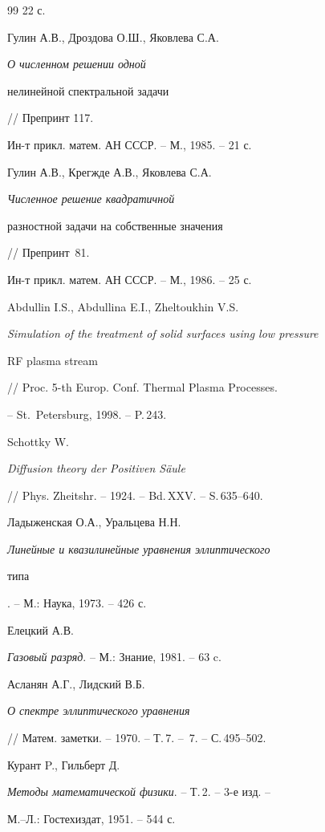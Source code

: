 \begin{thebibliography}{99}
22 с. 




Гулин А.В., Дроздова О.Ш., Яковлева С.А. {\em О численном решении одной


нелинейной спектральной задачи} // Препринт \No\.117.


Ин-т прикл. матем. АН СССР. -- М., 1985. -- 21 с. 




Гулин А.В., Крегжде А.В., Яковлева С.А. {\em Численное решение квадратичной


разностной задачи на собственные значения} // Препринт \No\,81.


Ин-т прикл. матем. АН СССР. -- М., 1986. -- 25 с. 




Abdullin I.S., Abdullina E.I., Zheltoukhin V.S.


{\em Simulation of the treatment of solid surfaces using low pressure


RF plasma stream} // Proc. 5-th Europ. Conf. Thermal Plasma Processes.


-- St.~Petersburg, 1998. -- P.\,243.




Schottky W. 


{\em Diffusion theory der Positiven S\"aule}


// Phys. Zheitshr. -- 1924. -- Bd.\,XXV. -- S.\,635--640. 




Ладыженская О.А., Уральцева Н.Н.


{\em Линейные и квазилинейные уравнения эллиптического


типа}. -- М.: Наука, 1973. -- 426 с.




Елецкий А.В.


{\em Газовый разряд}. -- М.: Знание, 1981. -- 63 c.




Асланян А.Г., Лидский В.Б.


{\em О спектре эллиптического уравнения}


// Матем. заметки. -- 1970. -- Т.\,7. -- \No\,7. -- С.\,495--502.




Курант P., Гильберт Д.


{\em Методы математической физики}. -- Т.\,2. -- 3-е изд. --


М.--Л.: Гостехиздат, 1951. -- 544 с.





\end{thebibliography}





\vskip 2cm












\label{end}





